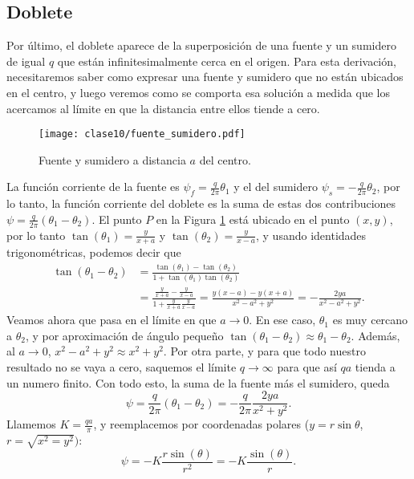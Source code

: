 \subsection*{Doblete}
Por último, el doblete aparece de la superposición de una fuente y un sumidero de igual $q$ que están infinitesimalmente cerca en el origen.
Para esta derivación, necesitaremos saber como expresar una fuente y sumidero que no están ubicados en el centro, y luego veremos como se comporta esa solución a medida que los acercamos al límite en que la distancia entre ellos tiende a cero.
%
\begin{figure}[!h]
\centering
\texttt{[image: clase10/fuente\_sumidero.pdf]}
\caption{Fuente y sumidero a distancia $a$ del centro.}
\label{fig:fuente_sumidero}
\end{figure}

La función corriente de la fuente es $\psi_f=\frac{q}{2\pi}\theta_1$ y el del sumidero $\psi_s=-\frac{q}{2\pi}\theta_2$, por lo tanto, la función corriente del doblete es la suma de estas dos contribuciones $\psi=\frac{q}{2\pi}(\theta_1-\theta_2)$.
El punto $P$ en la Figura \ref{fig:fuente_sumidero} está ubicado en el punto $(x,y)$, por lo tanto $\tan(\theta_1)=\frac{y}{x+a}$ y $\tan(\theta_2)=\frac{y}{x-a}$, y usando identidades trigonométricas, podemos decir que
%
\begin{align}
\tan(\theta_1-\theta_2) &= \frac{\tan(\theta_1)-\tan(\theta_2)}{1+\tan(\theta_1)\tan(\theta_2)}\nonumber\\
&=\frac{\frac{y}{x+a}-\frac{y}{x-a}}{1+\frac{y}{x+a}\frac{y}{x-a}} = \frac{y(x-a)-y(x+a)}{x^2-a^2+y^2} = -\frac{2ya}{x^2-a^2+y^2}.
\end{align}
%
Veamos ahora que pasa en el límite en que $a\to0$.
En ese caso, $\theta_1$ es muy cercano a $\theta_2$, y por aproximación de ángulo pequeño $\tan(\theta_1-\theta_2)\approx\theta_1-\theta_2$.
Además, al $a\to0$, $x^2-a^2+y^2\approx x^2+y^2$.
Por otra parte, y para que todo nuestro resultado no se vaya a cero, saquemos el límite $q\to\infty$ para que así $qa$ tienda a un numero finito.
Con todo esto, la suma de la fuente más el sumidero, queda
%
\begin{equation}
\psi=\frac{q}{2\pi}(\theta_1-\theta_2) = -\frac{q}{2\pi}\frac{2ya}{x^2+y^2}.
\end{equation}
%
Llamemos $K=\frac{qa}{\pi}$, y reemplacemos por coordenadas polares ($y=r\sin\theta$, $r=\sqrt{x^2=y^2})$:
%
\begin{equation}
\psi = -K\frac{r\sin(\theta)}{r^2}=-K\frac{\sin(\theta)}{r}.
\end{equation}

